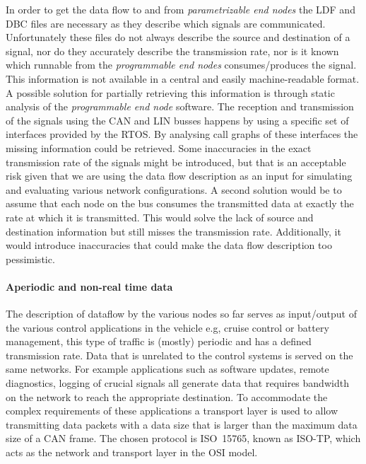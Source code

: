 In order to get the data flow to and from \textit{parametrizable end nodes} the LDF and DBC files are necessary as they describe which signals are communicated. Unfortunately these files do not always describe the source and destination of a signal, nor do they accurately describe the transmission rate, nor is it known which runnable from the \textit{programmable end nodes} consumes/produces the signal. This information is not available in a central and easily machine-readable format. A possible solution for partially retrieving this information is through static analysis of the \textit{programmable end node} software. The reception and transmission of the signals using the CAN and LIN busses happens by using a specific set of interfaces provided by the RTOS. By analysing call graphs of these interfaces the missing information could be retrieved. Some inaccuracies in the exact transmission rate of the signals might be introduced, but that is an acceptable risk given that we are using the data flow description as an input for simulating and evaluating various network configurations. A second solution would be to assume that each node on the bus consumes the transmitted data at exactly the rate at which it is transmitted. This would solve the lack of source and destination information but still misses the transmission rate. Additionally, it would introduce inaccuracies that could make the data flow description too pessimistic.

\paragraph{Aperiodic and non-real time data}
The description of dataflow by the various nodes so far serves as input/output of the various control applications in the vehicle e.g, cruise control or battery management, this type of traffic is (mostly) periodic and has a defined transmission rate. Data that is unrelated to the control systems is served on the same networks. For example applications such as software updates, remote diagnostics, logging of crucial signals all generate data that requires bandwidth on the network to reach the appropriate destination. To accommodate the complex requirements of these applications a transport layer is used to allow transmitting data packets with a data size that is larger than the maximum data size of a CAN frame. The chosen protocol is ISO~15765, known as ISO-TP, which acts as the network and transport layer in the OSI model.

